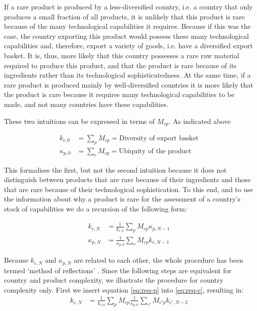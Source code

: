 \documentclass[11pt,a4paper]{article}
\begin{document}
If a rare product is produced by a less-diversified country, i.e. a country that only produces a small fraction of all products, it is unlikely that this product is rare because of the many technological capabilities it requires.
Because if this was the case, the country exporting this product would possess these many technological capabilities and, therefore, export a variety of goods, i.e. have a diversified export basket. It is, thus, more likely that this country possesses a rare raw material required to produce this product, and that the product is rare because of its ingredients rather than its technological sophisticatedness.
At the same time, if a rare product is produced mainly by well-diversified countries it is more likely that the product is rare because it requires many technological capabilities to be made, and not many countries have these capabilities.

These two intuitions can be expressed in terms of  $M_{cp}$.
As indicated above

\begin{align}
k_{c,0} &= \sum_pM_{cp} = \text{Diversity of export basket}\\
\kappa_{p,0} &= \sum_cM_{cp} = \text{Ubiquity of the product}
\end{align}

This formalises the first, but not the second intuition because it does not distinguish between products that are rare because of their ingredients and those that are rare because of their technological sophistication.
To this end, and to use the information about why a product is rare for the assessment of a country's stock of capabilities we do a recursion of the following form:

\begin{align}
\label{eq:req-c}
k_{c,N} &= \frac{1}{k_{c,0}} \sum_pM_{cp} \kappa_{p,N-1} \\
\label{eq:req-p}
\kappa_{p,N} &= \frac{1}{\kappa_{p,0}} \sum_cM_{cp} k_{c,N-1}
\end{align}

Because $k_{c,N}$ and $\kappa_{p,N}$ are related to each other, the whole procedure has been termed `method of reflections' \citep{Hausmann:2013vj}.
Since the following steps are equivalent for country and product complexity, we illustrate the procedure for country complexity only.
First we insert equation \eqref{eq:req-p} into \eqref{eq:req-c}, resulting in:
\begin{align}
k_{c,N} &= \frac{1}{k_{c,0}} \sum_pM_{cp} \frac{1}{\kappa_{p,0}} \sum_{c'}M_{c'p} k_{c',N-2} 
\end{align}
\end{document}
